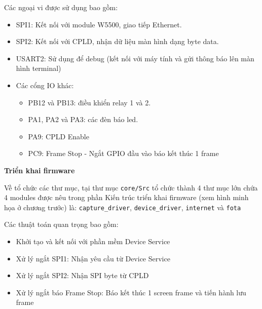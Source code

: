 Các ngoại vi được sử dụng bao gồm:
\begin{itemize}
    \item SPI1: Kết nối với module W5500, giao tiếp Ethernet.
    \item SPI2: Kết nối với CPLD, nhận dữ liệu màn hình dạng byte data.
    \item USART2: Sử dụng để debug (kết nối với máy tính và gửi thông báo lên màn hình terminal)
    \item Các cổng IO khác:
    \begin{itemize}
        \item PB12 và PB13: điều khiển relay 1 và 2.
        \item PA1, PA2 và PA3: các đèn báo led.
        \item PA9: CPLD Enable
        \item PC9: Frame Stop - Ngắt GPIO đầu vào báo kết thúc 1 frame 
    \end{itemize}
\end{itemize}

\FloatBarrier
\textbf{Triển khai firmware}

 \hspace{0.8cm} Về tổ chức các thư mục, tại thư mục \texttt{core/Src} tổ chức thành 4 thư mục lớn chứa 4 modules được nêu trong phần Kiến trúc triển khai firmware (xem hình minh họa ở chương trước) là: \texttt{capture\_driver}, \texttt{device\_driver}, \texttt{internet} và \texttt{fota}

 Các thuật toán quan trọng bao gồm:

 \begin{itemize}
    \item Khởi tạo và kết nối với phần mềm Device Service
    \item Xử lý ngắt SPI1: Nhận yêu cầu từ Device Service
    \item Xử lý ngắt SPI2: Nhận SPI byte từ CPLD
    \item Xử lý ngắt báo Frame Stop: Báo kết thúc 1 screen frame và tiến hành lưu frame
 \end{itemize}


